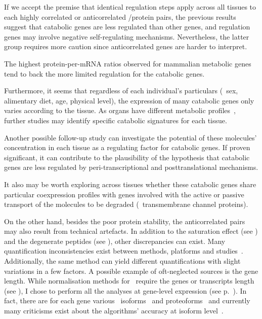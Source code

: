 If we accept the premise that
identical regulation steps apply across all tissues
to each highly correlated or anticorrelated \mRNA/protein pairs,
the previous results suggest that
catabolic genes are less regulated than other genes,
and
regulation genes may involve negative self-regulating mechanisms.
Nevertheless, the latter group requires more caution
since anticorrelated genes are harder to interpret.\mybr\

The highest protein-per-mRNA ratios observed
for mammalian metabolic genes~ tend
to back the more limited regulation for the catabolic genes.

Furthermore, it seems that regardless of each individual's particulars
(\eg\ sex, alimentary diet, age, physical level),
the expression of many catabolic genes only varies according to the tissue.
As organs have different metabolic profiles~,
further studies may identify specific catabolic signatures for each tissue.

Another possible follow-up study can investigate
the potential of these molecules' concentration in each tissue
as a regulating factor for catabolic genes.
If proven significant,
it can contribute to the plausibility of the hypothesis that
catabolic genes are less regulated
by peri-transcriptional and posttranslational mechanisms.

It also may be worth exploring across tissues
whether these catabolic genes share particular coexpression profiles
with genes involved with the active or passive transport of the molecules
to be degraded (\eg\ transmembrane channel proteins).\mybr\

On the other hand,
besides the poor protein stability,
the anticorrelated pairs may also result from technical artefacts.
In addition to the saturation effect (see )
and the degenerate peptides (see ),
other discrepancies can exist.
Many quantification inconsistencies exist
between methods, platforms and studies~.
Additionally, the same method can yield different quantifications
with slight variations in a few factors.
A possible example of oft-neglected sources is the gene length.
While normalisation methods for \Rnaseq\ require the genes or transcripts length
(see ),
I chose to perform all the analyses at gene-level expression
(see p.~\pageref{minisec:quantNorm}).
In fact, there are for each gene various \mRNA\ isoforms~
and proteoforms~
and currently many criticisms exist about
the algorithms' accuracy at isoform level~.\mybr\

